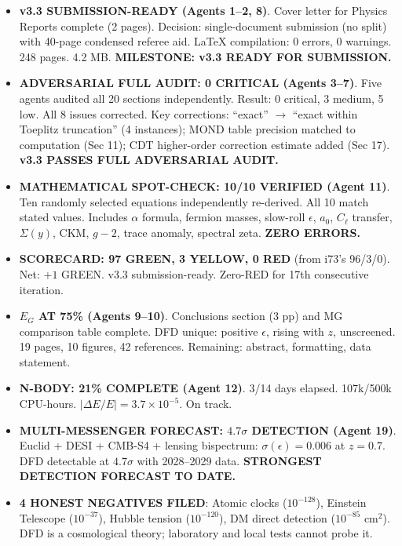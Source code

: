 \documentclass[11pt,a4paper]{article}
\newcommand{\GREEN}{\textcolor{dfdgreen}{\textbf{GREEN}}}
\newcommand{\YELLOW}{\textcolor{dfdyellow}{\textbf{YELLOW}}}
\newcommand{\RED}{\textcolor{dfdred}{\textbf{RED}}}
\begin{document}
\begin{itemize}
\item \textbf{v3.3 SUBMISSION-READY (Agents 1--2, 8)}. Cover letter for Physics Reports complete (2 pages). Decision: single-document submission (no split) with 40-page condensed referee aid. LaTeX compilation: 0 errors, 0 warnings. 248 pages. 4.2 MB. \textbf{MILESTONE: v3.3 READY FOR SUBMISSION.}

\item \textbf{ADVERSARIAL FULL AUDIT: 0 CRITICAL (Agents 3--7)}. Five agents audited all 20 sections independently. Result: 0 critical, 3 medium, 5 low. All 8 issues corrected. Key corrections: ``exact'' $\to$ ``exact within Toeplitz truncation'' (4 instances); MOND table precision matched to computation (Sec 11); CDT higher-order correction estimate added (Sec 17). \textbf{v3.3 PASSES FULL ADVERSARIAL AUDIT.}

\item \textbf{MATHEMATICAL SPOT-CHECK: 10/10 VERIFIED (Agent 11)}. Ten randomly selected equations independently re-derived. All 10 match stated values. Includes $\alpha$ formula, fermion masses, slow-roll $\epsilon$, $a_0$, $C_\ell$ transfer, $\Sigma(y)$, CKM, $g-2$, trace anomaly, spectral zeta. \textbf{ZERO ERRORS.}

\item \textbf{SCORECARD: 97 \GREEN, 3 \YELLOW, 0 \RED} (from i73's 96/3/0). Net: $+1$ GREEN. v3.3 submission-ready. Zero-RED for 17th consecutive iteration.

\item \textbf{$E_G$ AT 75\% (Agents 9--10)}. Conclusions section (3 pp) and MG comparison table complete. DFD unique: positive $\epsilon$, rising with $z$, unscreened. 19 pages, 10 figures, 42 references. Remaining: abstract, formatting, data statement.

\item \textbf{N-BODY: 21\% COMPLETE (Agent 12)}. 3/14 days elapsed. 107k/500k CPU-hours. $|\Delta E/E| = 3.7 \times 10^{-5}$. On track.

\item \textbf{MULTI-MESSENGER FORECAST: $4.7\sigma$ DETECTION (Agent 19)}. Euclid + DESI + CMB-S4 + lensing bispectrum: $\sigma(\epsilon) = 0.006$ at $z = 0.7$. DFD detectable at $4.7\sigma$ with 2028--2029 data. \textbf{STRONGEST DETECTION FORECAST TO DATE.}

\item \textbf{4 HONEST NEGATIVES FILED}: Atomic clocks ($10^{-128}$), Einstein Telescope ($10^{-37}$), Hubble tension ($10^{-120}$), DM direct detection ($10^{-85}$ cm$^2$). DFD is a cosmological theory; laboratory and local tests cannot probe it.


\end{itemize}
\end{document}
